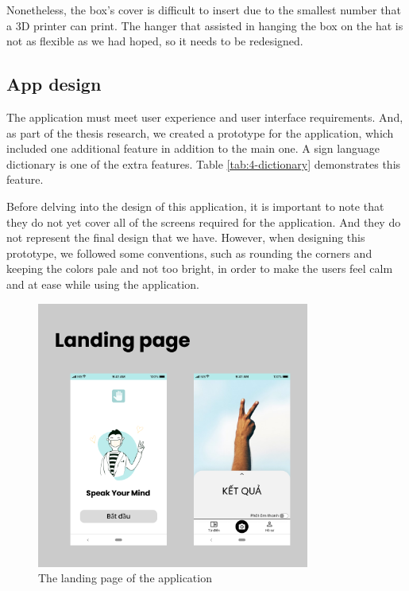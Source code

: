 Nonetheless, the box's cover is difficult to insert due to the smallest number that a 3D printer can print. The hanger that assisted in hanging the box on the hat is not as flexible as we had hoped, so it needs to be redesigned.

\subsection{App design}

The application must meet user experience and user interface requirements. And, as part of the thesis research, we created a prototype for the application, which included one additional feature in addition to the main one. A sign language dictionary is one of the extra features. Table \ref{tab:4-dictionary} demonstrates this feature.

Before delving into the design of this application, it is important to note that they do not yet cover all of the screens required for the application. And they do not represent the final design that we have. However, when designing this prototype, we followed some conventions, such as rounding the corners and keeping the colors pale and not too bright, in order to make the users feel calm and at ease while using the application.

\begin{figure}[H]
	\centering
	\includegraphics[width=0.8\textwidth]{img/Chap5/Landing_page.png}
	\caption{The landing page of the application}
\end{figure}


